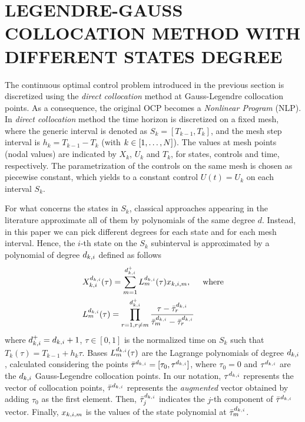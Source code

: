 \section*{LEGENDRE-GAUSS COLLOCATION METHOD WITH DIFFERENT STATES DEGREE}
The %
continuous optimal control problem introduced in the previous section is discretized using the \emph{direct collocation} method at Gauss-Legendre collocation points. As a consequence, the original OCP becomes a \emph{Nonlinear Program} (NLP). In \emph{direct collocation} method the time horizon is discretized on a fixed mesh, where the generic interval is denoted as $S_{k} = [T_{k-1}, T_{k}]$, and the mesh step interval is $h_{k} = T_{k-1} - T_{k}$ (with $k \in [1,\dots,N]$). The values at mesh points (nodal values) are indicated by $X_{k}$, $U_{k}$ and $T_{k}$, for  states, controls and time, respectively.
The parametrization of the controls on the same mesh is chosen as piecewise constant, which yields to a constant control $U(t) = U_{k}$ on each interval $S_k$.

For what concerns the states in $S_{k}$, classical approaches appearing in the literature approximate all of them by polynomials of the same degree $d$.
Instead, in this paper we can pick different degrees for each state and for each mesh interval. Hence, the $i$-th state on the $S_{k}$ subinterval is approximated by a polynomial of degree $d_{k,i}$ defined as follows
\begin{subequations}
	\begin{align}
	&X_{k,i}^{d_{k,i}} (\tau) = \sum_{m=1}^{d_{k,i}^{+}} L_{m}^{d_{k,i}}(\tau)x_{k,i,m}, \hspace{5mm} \text{where} \label{Xpoly}\\
	&L_{m}^{d_{k,i}} (\tau) = \prod_{r=1, r\neq m}^{d_{k,i}^{+}} \dfrac{\tau - \bar{\tau}^{d_{k,i}}_{r}}{\bar{\tau}^{d_{k,i}}_{m} - \bar{\tau}^{d_{k,i}}_{r}} \label{BLagrange}
	\end{align}
\end{subequations}
where $d_{k,i}^{+} = d_{k,i} + 1$, $\tau \in [0,1]$ is the normalized time on $S_k$ such that $T_k(\tau) = T_{k-1} + h_k\tau$.
Bases $L_{m}^{d_{k,i}} (\tau)$ are the Lagrange polynomials of degree $d_{k,i}$, calculated considering the points $\bar{\tau}^{d_{k,i}} = [\tau_{0}, \tau^{d_{k,i}}]$, where $\tau_{0} = 0$ and $\tau^{d_{k,i}}$ are the $d_{k,i}$ Gauss-Legendre collocation points. In our notation, $\tau^{d_{k,i}}$  represents the vector of collocation points, $\bar{\tau}^{d_{k,i}}$ represents the \emph{augmented} vector obtained by adding $\tau_{0}$ as the first element.
Then, $\bar{\tau}^{d_{k,i}}_{j}$ indicates the $j$-th component of $\bar{\tau}^{d_{k,i}}$ vector.
Finally, $x_{k,i,m}$ is the values of the state polynomial at $\bar{\tau}^{d_{k,i}}_{m}$.

